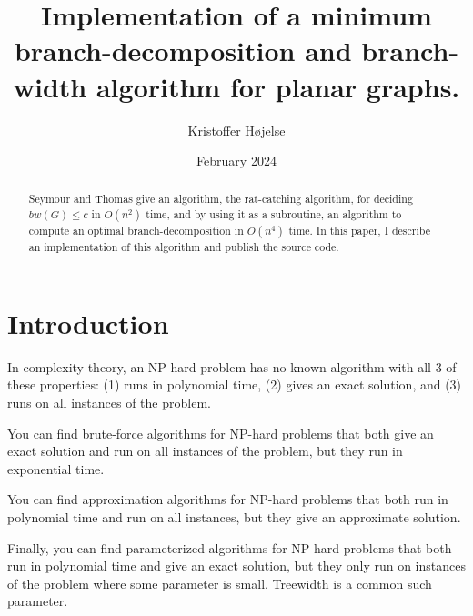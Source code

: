 \documentclass{article}
\title{Implementation of a minimum branch-decomposition and branch-width algorithm for planar graphs.}
\author{Kristoffer Højelse}
\date{February 2024}
\begin{document}
\maketitle


\begin{abstract}
	Seymour and Thomas give an algorithm, the rat-catching algorithm, for deciding $bw(G) \leq c$ in $O(n^2)$ time, and by using it as a subroutine, an algorithm to compute an optimal branch-decomposition in $O(n^4)$ time. In this paper, I describe an implementation of this algorithm and publish the source code.
\end{abstract}


\section{Introduction}


	In complexity theory, an NP-hard problem has no known algorithm with all 3 of these properties: (1) runs in polynomial time, (2) gives an exact solution, and (3) runs on all instances of the problem.

	You can find brute-force algorithms for NP-hard problems that both give an exact solution and run on all instances of the problem, but they run in exponential time.

	You can find approximation algorithms for NP-hard problems that both run in polynomial time and run on all instances, but they give an approximate solution.

	Finally, you can find parameterized algorithms for NP-hard problems that both run in polynomial time and give an exact solution, but they only run on instances of the problem where some parameter is small. Treewidth is a common such parameter.
	
\end{document}
